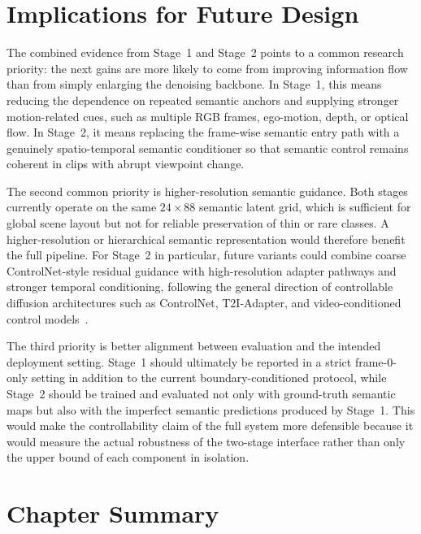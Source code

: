 \FloatBarrier
\section{Implications for Future Design}
\label{sec:stage1_future}

The combined evidence from Stage~1 and Stage~2 points to a common research priority: the next gains are more likely to come from improving information flow than from simply enlarging the denoising backbone. In Stage~1, this means reducing the dependence on repeated semantic anchors and supplying stronger motion-related cues, such as multiple RGB frames, ego-motion, depth, or optical flow. In Stage~2, it means replacing the frame-wise semantic entry path with a genuinely spatio-temporal semantic conditioner so that semantic control remains coherent in clips with abrupt viewpoint change.

The second common priority is higher-resolution semantic guidance. Both stages currently operate on the same $24 \times 88$ semantic latent grid, which is sufficient for global scene layout but not for reliable preservation of thin or rare classes. A higher-resolution or hierarchical semantic representation would therefore benefit the full pipeline. For Stage~2 in particular, future variants could combine coarse ControlNet-style residual guidance with high-resolution adapter pathways and stronger temporal conditioning, following the general direction of controllable diffusion architectures such as ControlNet, T2I-Adapter, and video-conditioned control models~\cite{zhang2023adding,mou2024t2i,hu2023videocontrolnet}.

The third priority is better alignment between evaluation and the intended deployment setting. Stage~1 should ultimately be reported in a strict frame-0-only setting in addition to the current boundary-conditioned protocol, while Stage~2 should be trained and evaluated not only with ground-truth semantic maps but also with the imperfect semantic predictions produced by Stage~1. This would make the controllability claim of the full system more defensible because it would measure the actual robustness of the two-stage interface rather than only the upper bound of each component in isolation.

\FloatBarrier
\section{Chapter Summary}
\label{sec:conclusion}

